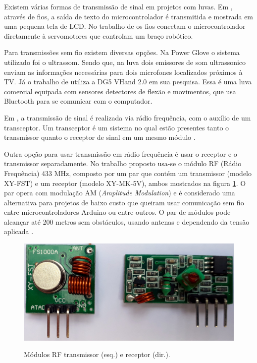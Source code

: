 \documentclass[
	12pt,				%
	openright,			%
	oneside,			%
	a4paper,			%
	english,			%
	brazil				%
	]{abntex2}
\begin{document}
		Existem várias formas de transmissão de sinal em projetos com luvas. Em \cite{solanki2013sign}, através de fios, a saída de texto do microcontrolador é transmitida e mostrada em uma pequena tela de LCD. No trabalho de \cite{syed2012armcontroller} os fios conectam o microcontrolador diretamente à servomotores que controlam um braço robótico.

		Para transmissões sem fio existem diversas opções. Na Power Glove \cite{dana1989powerglove} o sistema utilizado foi o ultrassom. Sendo que, na luva dois emissores de som ultrassonico enviam as informações necessárias para dois microfones localizados próximos à TV. Já o trabalho de \cite{kumar2012hci} utiliza a DG5 VHand 2.0 em sua pesquisa. Essa é uma luva comercial equipada com sensores detectores de flexão e movimentos, que usa Bluetooth para se comunicar com o computador.
		
		Em \cite{michela2013rehab}, a transmissão de sinal é realizada via rádio frequência, com o auxílio de um transceptor. Um transceptor é um sistema no qual estão presentes tanto o transmissor quanto o receptor de sinal em um mesmo módulo \cite{scott2017transceiver}.

		Outra opção para usar transmissão em rádio frequência é usar o receptor e o transmissor separadamente. No trabalho proposto usa-se o módulo RF (Rádio Frequência) 433 MHz, composto por um par que contém um transmissor (modelo XY-FST) e um receptor (modelo XY-MK-5V), ambos mostrados na figura \ref{Fig:tx-rx1}. O par opera com modulação AM (\textit{Amplitude Modulation}) e é considerado uma alternativa para projetos de baixo custo que queiram usar comunicação sem fio entre microcontroladores Arduino ou entre outros. O par de módulos pode alcançar até 200 metros sem obstáculos, usando antenas e dependendo da tensão aplicada \cite{institutodigitalrf}.


		\begin{figure}[h!]
			\centering
			\caption{Módulos RF transmissor (esq.) e receptor (dir.).}
  		\includegraphics[width=12cm]{./figures/tx-rx1.jpg}
  		\label{Fig:tx-rx1}
		\end{figure}
\end{document}
